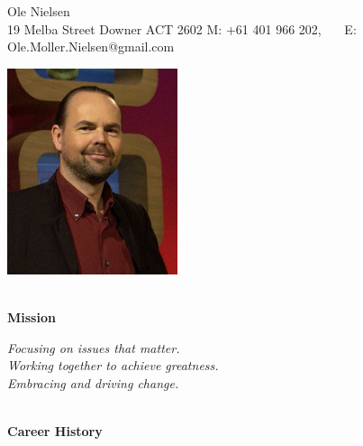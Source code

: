 \documentclass[11pt,a4paper]{article}
\begin{document}
\begin{center}
  Ole Nielsen \\
  19 Melba Street
  Downer ACT 2602
  M: +61 401 966 202, \ \ \ E: Ole.Moller.Nielsen@gmail.com
\end{center}
\begin{center}
\includegraphics[width=50mm,keepaspectratio=true]{ole.jpg}
\end{center}

\begin{center}
  \hrulefill \\
  {\bf Mission} \\[-0.2cm]
  \hrulefill
\end{center}

\begin{center}
\emph{Focusing on issues that matter.}\\
\emph{Working together to achieve greatness.}\\
\emph{Embracing and driving change.}
\end{center}



\begin{center}
  \hrulefill \\
  {\bf Career History} \\[-0.2cm]
  \hrulefill
\end{center}
\end{document}
